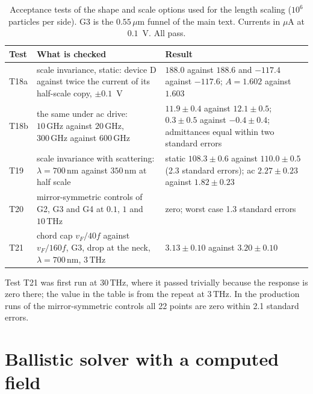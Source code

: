 \documentclass[aps,prapplied,onecolumn,superscriptaddress,floatfix]{revtex4-2}
\newcommand{\vF}{v_{F}}
\newcommand{\um}{\,\mu\mathrm{m}}
\newcommand{\nm}{\,\mathrm{nm}}
\newcommand{\THz}{\,\mathrm{THz}}
\newcommand{\GHz}{\,\mathrm{GHz}}
\begin{document}
\begin{table}[ht]
\caption{Acceptance tests of the shape and scale options used for the
length scaling ($10^{6}$ particles per side). G3 is the $0.55\um$ funnel of
the main text. Currents in $\mu$A at $0.1$~V. All pass.}
\begin{ruledtabular}
\begin{tabular}{lp{}p{}}
Test & What is checked & Result \\
\hline
T18a & scale invariance, static: device D against twice the current of its half-scale copy, $\pm0.1$~V & $188.0$ against $188.6$ and $-117.4$ against $-117.6$; $A=1.602$ against $1.603$ \\
T18b & the same under ac drive: $10\GHz$ against $20\GHz$, $300\GHz$ against $600\GHz$ & $11.9\pm0.4$ against $12.1\pm0.5$; $0.3\pm0.5$ against $-0.4\pm0.4$; admittances equal within two standard errors \\
T19 & scale invariance with scattering: $\lambda=700\nm$ against $350\nm$ at half scale & static $108.3\pm0.6$ against $110.0\pm0.5$ (2.3 standard errors); ac $2.27\pm0.23$ against $1.82\pm0.23$ \\
T20 & mirror-symmetric controls of G2, G3 and G4 at $0.1$, $1$ and $10\THz$ & zero; worst case 1.3 standard errors \\
T21 & chord cap $\vF/40f$ against $\vF/160f$, G3, drop at the neck, $\lambda=700\nm$, $3\THz$ & $3.13\pm0.10$ against $3.20\pm0.10$ \\
\end{tabular}
\end{ruledtabular}
\end{table}

Test T21 was first run at $30\THz$, where it passed trivially because the
response is zero there; the value in the table is from the repeat at
$3\THz$. In the production runs of the mirror-symmetric controls all 22
points are zero within 2.1 standard errors.

\section{Ballistic solver with a computed field}
\end{document}
